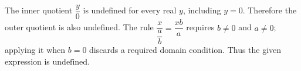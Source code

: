 The inner quotient $\dfrac{y}{0}$ is undefined for every real $y$, including $y=0$. Therefore the outer quotient is also undefined. The rule $\dfrac{x}{\dfrac{a}{b}}=\dfrac{xb}{a}$ requires $b\ne0$ and $a\ne0$; applying it when $b=0$ discards a required domain condition. Thus the given expression is $\boxed{\text{undefined}}$.
